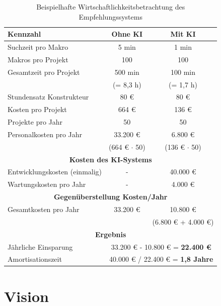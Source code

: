 \begin{table}[htbp] 
    \centering 
    \caption{Beispielhafte Wirtschaftlichkeitsbetrachtung des Empfehlungssystems} 
    \label{tab:wirtschaftlichkeit_ki} 
    \begin{tabular}{lcc} 
        \hline Kennzahl & Ohne KI & Mit KI \\ 
        \hline Suchzeit pro Makro & 5 min & 1 min \\ Makros pro Projekt & 100 & 100 \\ 
        \hline Gesamtzeit pro Projekt & 500 min & 100 min \\ & (= 8,3 h) & (= 1,7 h) \\ Stundensatz Konstrukteur & 80 € & 80 € \\ 
        \hline Kosten pro Projekt & 664 € & 136 € \\ \hline Projekte pro Jahr & 50 & 50 \\ 
        \hline Personalkosten pro Jahr & 33.200 € & 6.800 € \\ & (664 € $\cdot$ 50) & (136 € $\cdot$ 50) \\ 
        \hline \multicolumn{3}{c}{\textbf{Kosten des KI-Systems}} \\ 
            \hline Entwicklungskosten (einmalig) & - & 40.000 € \\ Wartungskosten pro Jahr & - & 4.000 € \\ 
            \hline \multicolumn{3}{c}{\textbf{Gegenüberstellung Kosten/Jahr}} \\ 
            \hline Gesamtkosten pro Jahr & 33.200 € & 10.800 € \\ & & (6.800 € + 4.000 €) \\ \hline \multicolumn{3}{c}{\textbf{Ergebnis}} \\ 
            \hline Jährliche Einsparung & \multicolumn{2}{c}{33.200 € - 10.800 € = \textbf{22.400 €}} \\ 
            \hline Amortisationszeit & \multicolumn{2}{c}{40.000 € / 22.400 € = \textbf{1,8 Jahre}} \\ 
            \hline 
        \end{tabular} 
    \end{table}


\section{Vision}
\label{sec:vision}

